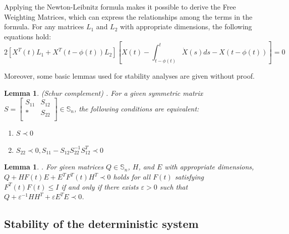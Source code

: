 \documentclass[a4paper]{cas-sc}
\newtheorem{lemma}[theorem]{Lemma}
\begin{document}
Applying the Newton-Leibnitz formula makes it possible to derive the Free Weighting Matrices, which can express the relationships among the terms in the formula. For any matrices $L_1$ and $L_2$ with appropriate dimensions, the following equations hold:
\begin{equation}
2\left[X^T(t)L_1+X^T(t-\phi(t))L_2\right]\left[X(t)-\int_{t-\phi(t)}^{t}\dot{X}(s)ds-X(t-\phi(t))\right]=0
\label{eq17}
\end{equation}

Moreover, some basic lemmas used for stability analyses are given without proof.


\begin{lemma}
  \label{lemma2} 
  (Schur complement) \citep{haynsworth1968schur}. For a given symmetric matrix $S=\left[\begin{matrix}S_{11}&S_{12}\\\ast&S_{22}\\\end{matrix}\right]\in\mathbb{S}_n$, the following conditions are equivalent:
  \begin{enumerate}
    \item $S\prec0$
    \item $S_{22}\prec0,S_{11}-S_{12}S_{22}^{-1}S_{12}^T\prec0$
  \end{enumerate}
\end{lemma}


\begin{lemma}
  \label{lemma1} 
  \citep{Gu2003}. For given matrices $Q\in\mathbb{S}_n$, $H$, and $E$ with appropriate dimensions, $Q+HF(t)E+E^TF^T(t)H^T\prec0$ holds for all $F(t)$ satisfying $F^T(t)F(t)\leqslant I$ if and only if there exists $\varepsilon>0$ such that
  $Q+\varepsilon^{-1}HH^T+\varepsilon E^TE\prec0$.
\end{lemma}

\subsection{Stability of the deterministic system}
\label{Section 4.1}
\end{document}
